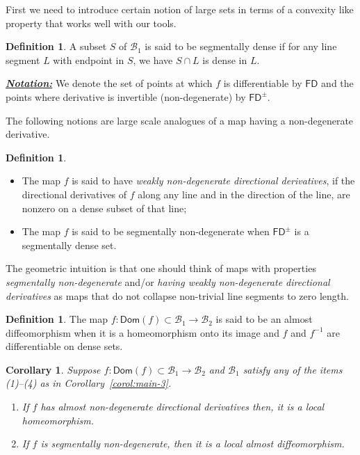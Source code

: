 \documentclass[a4, 12pt,leqno]{amsart}
\theoremstyle{plain}
\newtheorem{corollary}{Corollary}
\theoremstyle{definition}
\newtheorem{definition}[lemma]{Definition}
\theoremstyle{remark}
\numberwithin{equation}{section}
\newcommand{\B}{\mathcal{B}}
\begin{document}
First we need to introduce certain notion of large sets in terms of a convexity like property that works well with our tools. 
\begin{definition}
	A subset $S$ of $\B_1$ is said to be segmentally dense if for any line segment $L$ with endpoint in $S$, we have $S \cap L$ is dense in $L$. 
\end{definition}
\noindent\underline{\small \emph{\textbf{Notation:}}} We denote the set of points at which $f$ is differentiable by $\mathsf{FD}$ and the points where derivative is invertible (non-degenerate) by $\mathsf{FD}^{\pm}$.

\par The following notions are large scale analogues of a map having a non-degenerate derivative. 
\begin{definition}
	\hfill
	\begin{itemize}
		\item The map $f$ is said to have \emph{weakly non-degenerate directional derivatives}, if the directional derivatives of $f$ along any line and in the direction of the line, are nonzero on a dense subset of that line;
		\item The map $f$ is said to be segmentally non-degenerate when $\mathsf{FD}^{\pm}$ is a segmentally dense set. 
	\end{itemize}
\end{definition}
The geometric intuition is that one should think of maps with properties \emph{segmentally non-degenerate} and/or \emph{having weakly non-degenerate directional derivatives} as maps that do not collapse non-trivial line segments to zero length. 

\begin{definition}
	The map $f: \mathsf{Dom}(f)\subset \B_1 \to \B_2$ is said to be an almost diffeomorphism when it is a homeomorphism onto its image and $f$ and $f^{-1}$ are differentiable on dense sets. 
\end{definition}

\begin{corollary}\label{corol:main-4}
	Suppose $f: \mathsf{Dom}(f) \subset \B_1 \to \B_2$ and $\B_1$ satisfy any of the items (1)--(4) as in Corollary~\ref{corol:main-3}.
\begin{enumerate}
	\item If $f$ has almost non-degenerate directional derivatives 
	then, it is a local homeomorphism.
	\item If $f$ is segmentally non-degenerate, then it is a local almost diffeomorphism. 
\end{enumerate}
\end{corollary}
\end{document}

